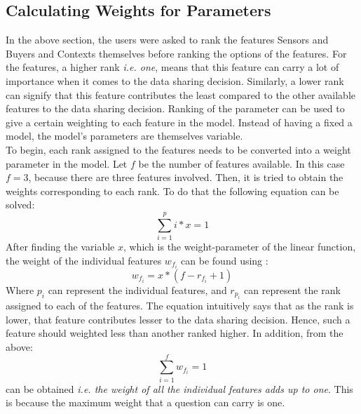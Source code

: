 \subsection{Calculating Weights for Parameters}
In the above section, the users were asked to rank the features Sensors and Buyers and Contexts themselves before ranking the options of the features. For the features, a higher rank {\it i.e. one}, means that this feature can carry a lot of
importance when it comes to the data sharing decision. Similarly, a lower rank can signify that this feature contributes the least compared to the other available features to the data sharing decision. 
Ranking of the parameter can be used to give a certain weighting to each feature in the model. Instead of having a fixed a model, the model's parameters are themselves variable.\\
To begin, each rank assigned to the features needs to be converted into a weight parameter in the model. Let $f$ be the number of features available. In this case $f=3$, because there are three features involved. Then, it is tried to obtain the 
weights corresponding to each rank. To do that the following equation can be solved:
$$\sum^{p}_{i=1} i*x = 1$$
After finding the variable $x$, which is the weight-parameter of the linear function, the weight of the individual features $w_{f_{i}}$ can be found using :
$$w_{f_{i}} = x* (f - r_{f_{i}} + 1)$$
Where $p_{i}$ can represent the individual features, and $r_{p_{i}}$ can represent the rank assigned to each of the features. The equation intuitively says that
as the rank is lower, that feature contributes lesser to the data sharing decision. Hence, such a feature should weighted less than another ranked higher.
In addition, from the above: $$\sum^{f}_{i=1} w_{f_{i}} = 1$$ can be obtained {\it i.e. the weight of all the individual features adds up to one}. This is because the maximum weight that a question can carry is one.

